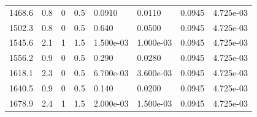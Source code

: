 \documentclass[preview]{standalone}
\begin{document}
{{\begin{tabular}{L{1.2cm}C{1.2cm} C{0.3cm}C{0.5cm} C{1.4cm}C{1.4cm} C{1.4cm}C{1.4cm}}
  1468.6  &   0.8  & 0     & 0.5 &  0.0910  & 0.0110  & 0.0945 &  4.725e-03   \\ 
  1502.3  &   0.8  & 0     & 0.5 &  0.640  & 0.0500  & 0.0945 &  4.725e-03   \\ 
  1545.6  &   2.1  & 1     & 1.5 &  1.500e-03  & 1.000e-03  & 0.0945 &  4.725e-03   \\ 
  1556.2  &   0.9  & 0     & 0.5 &  0.290  & 0.0280  & 0.0945 &  4.725e-03   \\ 
  1618.1  &   2.3  & 0     & 0.5 &  6.700e-03  & 3.600e-03  & 0.0945 &  4.725e-03   \\ 
  1640.5  &   0.9  & 0     & 0.5 &  0.140  & 0.0200  & 0.0945 &  4.725e-03   \\ 
  1678.9  &   2.4  & 1     & 1.5 &  2.000e-03  & 1.500e-03  & 0.0945 &  4.725e-03   \\ 
\hline 
\end{tabular} 

}}
\end{document}
